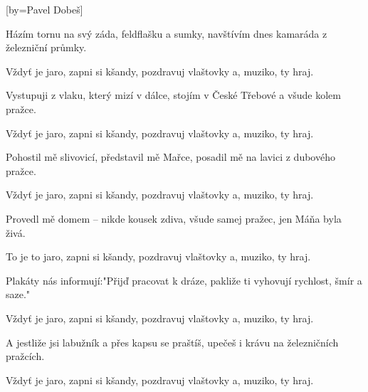 [by={Pavel Dobeš}]

\beginverse{}
Házím tornu na svý záda, feldflašku a sumky,
navštívím dnes kamaráda z železniční průmky.
\endverse{}

\beginchorus{}
Vždyť je jaro, zapni si kšandy,
pozdravuj vlaštovky a, muziko, ty hraj.
\endchorus{}

\beginverse{}
\chordsoff{}
Vystupuji z vlaku, který mizí v dálce,
stojím v České Třebové a všude kolem pražce.
\chordson{}
\endverse{}

\repeatingchorus{}
\beginchorus{}
\chordsoff{}
Vždyť je jaro, zapni si kšandy,
pozdravuj vlaštovky a, muziko, ty hraj.
\chordson{}
\endchorus{}

\beginverse{}
\chordsoff{}
Pohostil mě slivovicí, představil mě Mařce,
posadil mě na lavici z dubového pražce.
\chordson{}
\endverse{}

\repeatingchorus{}
\beginchorus{}
\chordsoff{}
Vždyť je jaro, zapni si kšandy,
pozdravuj vlaštovky a, muziko, ty hraj.
\chordson{}
\endchorus{}

\beginverse{}
\chordsoff{}
Provedl mě domem -- nikde kousek zdiva,
všude samej pražec, jen Máňa byla živá.
\chordson{}
\endverse{}

\beginchorus{}
\chordsoff{}
To je to jaro, zapni si kšandy,
pozdravuj vlaštovky a, muziko, ty hraj.
\chordson{}
\endchorus{}

\beginverse{}
\chordsoff{}
Plakáty nás informují:"Přijď pracovat k dráze,
pakliže ti vyhovují rychlost, šmír a saze."
\chordson{}
\endverse{}

\repeatingchorus{}
\beginchorus{}
\chordsoff{}
Vždyť je jaro, zapni si kšandy,
pozdravuj vlaštovky a, muziko, ty hraj.
\chordson{}
\endchorus{}

\beginverse{}
\chordsoff{}
A jestliže jsi labužník a přes kapsu se praštíš,
upečeš i krávu na železničních pražcích.
\chordson{}
\endverse{}

\repeatingchorus{}
\beginchorus{}
\chordsoff{}
Vždyť je jaro, zapni si kšandy,
pozdravuj vlaštovky a, muziko, ty hraj.
\chordson{}
\endchorus{}

